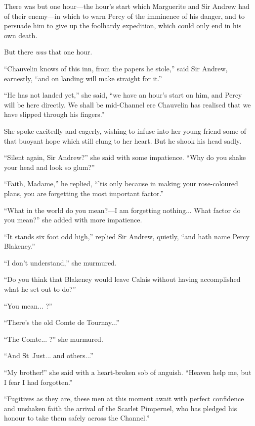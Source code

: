 There was but one hour---the hour's start which Marguerite and Sir Andrew had of their enemy---in which to warn Percy of the imminence of his danger, and to persuade him to give up the foolhardy expedition, which could only end in his own death.

But there \textit{was} that one hour.

\enquote{Chauvelin knows of this inn, from the papers he stole,} said Sir Andrew, earnestly, \enquote{and on landing will make straight for it.}

\enquote{He has not landed yet,} she said, \enquote{we have an hour's start on him, and Percy will be here directly. We shall be mid-Channel ere Chauvelin has realised that we have slipped through his fingers.}

She spoke excitedly and eagerly, wishing to infuse into her young friend some of that buoyant hope which still clung to her heart. But he shook his head sadly.

\enquote{Silent again, Sir Andrew?} she said with some impatience. \enquote{Why do you shake your head and look so glum?}

\enquote{Faith, Madame,} he replied, \enquote{’tis only because in making your rose-coloured plans, you are forgetting the most important factor.}

\enquote{What in the world do you mean?---I am forgetting nothing... What factor do you mean?} she added with more impatience.

\enquote{It stands six foot odd high,} replied Sir Andrew, quietly, \enquote{and hath name Percy Blakeney.}

\enquote{I don't understand,} she murmured.

\enquote{Do you think that Blakeney would leave Calais without having accomplished what he set out to do?}

\enquote{You mean... ?}

\enquote{There's the old Comte de Tournay...}

\enquote{The Comte... ?} she murmured.

\enquote{And St~Just... and others...}

\enquote{My brother!} she said with a heart-broken sob of anguish. \enquote{Heaven help me, but I fear I had forgotten.}

\enquote{Fugitives as they are, these men at this moment await with perfect confidence and unshaken faith the arrival of the Scarlet Pimpernel, who has pledged his honour to take them safely across the Channel.}

